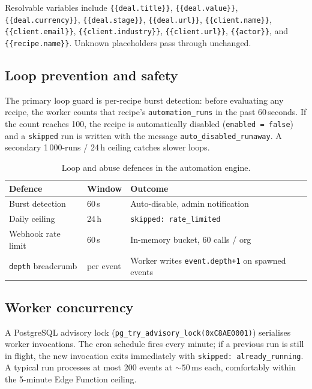 \documentclass[11pt,a4paper,oneside]{article}
\newcommand{\code}[1]{\texttt{\small #1}}
\begin{document}
Resolvable variables include
\code{\{\{deal.title\}\}}, \code{\{\{deal.value\}\}},
\code{\{\{deal.currency\}\}}, \code{\{\{deal.stage\}\}},
\code{\{\{deal.url\}\}},
\code{\{\{client.name\}\}}, \code{\{\{client.email\}\}},
\code{\{\{client.industry\}\}}, \code{\{\{client.url\}\}},
\code{\{\{actor\}\}}, and \code{\{\{recipe.name\}\}}. Unknown
placeholders pass through unchanged.

\subsection{Loop prevention and safety}

The primary loop guard is per-recipe burst detection: before
evaluating any recipe, the worker counts that recipe's
\code{automation\_runs} in the past 60\,seconds. If the count reaches
100, the recipe is automatically disabled
(\code{enabled = false}) and a \code{skipped} run is written with the
message \code{auto\_disabled\_runaway}. A secondary 1\,000-runs / 24\,h
ceiling catches slower loops.

\begin{table}[H]
\centering
\small
\begin{tabular}{@{}lll@{}}
\toprule
\textbf{Defence}                  & \textbf{Window} & \textbf{Outcome} \\
\midrule
Burst detection                   & 60\,s            & Auto-disable, admin notification \\
Daily ceiling                     & 24\,h            & \code{skipped: rate\_limited} \\
Webhook rate limit                & 60\,s            & In-memory bucket, 60 calls / org \\
\code{depth} breadcrumb            & per event       & Worker writes \code{event.depth+1} on spawned events \\
\bottomrule
\end{tabular}
\caption{Loop and abuse defences in the automation engine.}
\label{tab:loop}
\end{table}

\subsection{Worker concurrency}

A PostgreSQL advisory lock (\code{pg\_try\_advisory\_lock(0xC8AE0001)})
serialises worker invocations. The cron schedule fires every minute;
if a previous run is still in flight, the new invocation exits
immediately with \code{skipped: already\_running}. A typical run
processes at most 200 events at $\sim 50$\,ms each, comfortably within
the 5-minute Edge Function ceiling.
\end{document}
